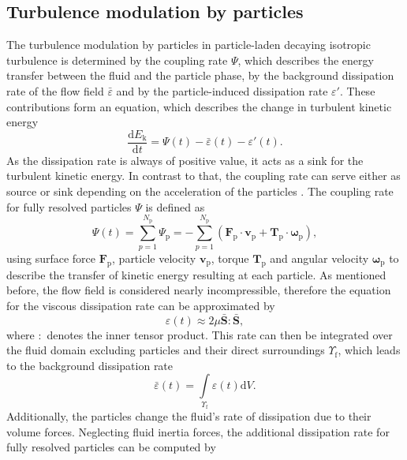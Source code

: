 \documentclass[11pt,a4paper,openany,oneside,parskip=half*]{article}
\renewcommand*\vec[1]{\boldsymbol{#1}}
\begin{document}
\subsection{Turbulence modulation by particles}
The turbulence modulation by particles in  particle-laden decaying isotropic turbulence is determined by the coupling rate $\Psi$, which describes the energy transfer between the fluid and the particle phase, by the background dissipation rate of the flow field $\bar{\varepsilon}$ and by the particle-induced dissipation rate $\varepsilon'$. These contributions form an equation, which describes the change in turbulent kinetic energy
\begin{equation}
\frac{\mathrm{d} E_\mathrm{k}}{\mathrm{d} t} = \Psi (t) - \bar{\varepsilon} (t) - \varepsilon' (t).
\end{equation}
As the dissipation rate is always of positive value, it acts as a sink for the turbulent kinetic energy. In contrast to that, the coupling rate can serve either as source or sink depending on the acceleration of the particles \cite{Schneiders2017}. The coupling rate for fully resolved particles $\Psi$ is defined as
\begin{equation}
\Psi (t) = \sum_{p=1}^{N_\mathrm{p}} \Psi_\mathrm{p}= - \sum_{p=1}^{N_\mathrm{p}} (\vec{F}_\mathrm{p} \cdot \vec{v}_\mathrm{p} + \vec{T}_\mathrm{p} \cdot \vec{\omega}_\mathrm{p}),
\end{equation}
using surface force $\vec{F}_\mathrm{p}$, particle velocity $\vec{v}_\mathrm{p}$, torque $\vec{T}_\mathrm{p}$ and angular velocity $\vec{\omega}_\mathrm{p}$ to describe the transfer of kinetic energy resulting at each particle. 
\newline
As mentioned before, the flow field is considered nearly incompressible, therefore the equation for the viscous dissipation rate can be approximated by
\begin{equation}
 \varepsilon (t) \approx 2 \mu \vec{\bar{S}}\vec{:}\vec{\bar{S}},
\end{equation}
where $\vec{:}$ denotes the inner tensor product. This rate can then be integrated over the fluid domain excluding particles and their direct surroundings $\Upsilon_\mathrm{f}$, which leads to the background dissipation rate
\begin{equation}
\bar{\varepsilon} (t) = \int\limits_{\Upsilon_\mathrm{f}} \varepsilon(t) \mathrm{d}V.
\end{equation}
Additionally, the particles change the fluid's rate of dissipation due to their volume forces. Neglecting fluid inertia forces, the additional dissipation rate for fully resolved particles can be computed by
\end{document}
